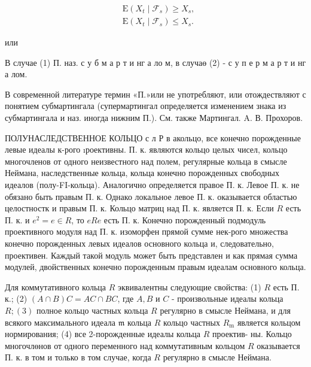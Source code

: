 \documentclass[10pt]{article}
\begin{document}
\[

\begin{aligned}

& \mathrm{E}\left(X_{t} \mid \mathscr{F}_{s}\right) \geqslant X_{s}, \\

& \mathrm{E}\left(X_{t} \mid \mathscr{F}_{s}\right) \leqslant X_{s} .

\end{aligned}

\]



или



В случае (1) П. наз. с у б м а р т и нг а ло м, в случаө (2) - с у п е р м а р т и нг а лом.



В современной литературе термин «П.»или не употребляют, или отождествляют с понятием субмартингала (супермартингал определяется изменением знака из субмартингала и наз. иногда нижним П.). См. также Мартингал. A. В. Прохоров.



ПОЛУНАСЛЕДСТВЕННОЕ КОЛЬЦО с л Р в акольцо, все конечно порожденные левые идеалы к-рого ıроективны. П. к. являются кольцо целых чисел, кольцо многочленов от одного неизвестного над полем, регулярные кольца в смысле Неймана, наследственные кольца, кольца конечно порожденных свободных идеалов (полу-FI-кольца). Аналогично определяется правое П. к. Левое П. к. не обязано быть правым П. к. Однако локальное левое П. к. оказывается областью целостностк и правым П. к. Кольцо матриц над П. к. является П. к. Если $R$ есть П. к. и $e^{2}=e \in R$, то $e R e$ есть П. к. Конечно порожденный подмодуль проективного модуля над П. к. изоморфен прямой сумме нек-рого множества конечно порожденных левых идеалов основного кольца и, следовательно, проективен. Каждый такой модуль может быть представлен и как прямая сумма модулей, двойственных конечно порожденным правым идеалам основного кольца.



Для коммутативного кольца $R$ эквивалентны следующие свойства: (1) $R$ есть П. к.; (2) $(A \cap B) C=A C \cap B C$, где $A, B$ и $C$ - произвольные идеалы кольца $R ;(3)$ полное кольцо частных кольца $R$ регулярно в смысле Неймана, и для всякого максимального идеала $\mathfrak{m}$ кольца $R$ кольцо частных $R_{\mathrm{m}}$ является кольцом нормирования; (4) все 2-порожденные идеалы кольца $R$ проектив- ны. Кольцо многочлөнов от одного переменного над коммутативным кольцом $R$ оказывается П. к. в том и только в том случае, когда $R$ регулярно в смысле Неймана.
\end{document}
